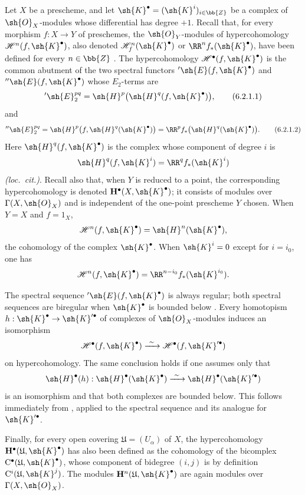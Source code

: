 \begin{env}[6.2.1]
\label{III.6.2.1}
Let $X$ be a prescheme, and let
$\sh{K}^\bullet=(\sh{K}^i)_{i\in\bb{Z}}$ be a complex of
$\sh{O}_X$-modules whose differential has degree $+1$.
Recall that, for every morphism $f:X\to Y$ of preschemes, the
$\sh{O}_Y$-modules of hypercohomology
$\mathcal{H}^n(f,\sh{K}^\bullet)$, also denoted
$\mathcal{H}_f^n(\sh{K}^\bullet)$ or
$\RR^n f_*(\sh{K}^\bullet)$, have been defined for every
$n\in\bb{Z}$ .  The hypercohomology
$\mathcal{H}^\bullet(f,\sh{K}^\bullet)$ is the common abutment of
the two spectral functors
$'\sh{E}(f,\sh{K}^\bullet)$ and
$''\sh{E}(f,\sh{K}^\bullet)$ whose $E_2$-terms are
\[
  '\sh{E}_2^{pq}
  =
  \sh{H}^p\bigl(\sh{H}^q(f,\sh{K}^\bullet)\bigr),
  \tag{6.2.1.1}\label{III.6.2.1.1}
\]
and
\[
  ''\sh{E}_2^{pq}
  =
  \sh{H}^p\bigl(f,\sh{H}^q(\sh{K}^\bullet)\bigr)
  =
  \RR^p f_*\bigl(\sh{H}^q(\sh{K}^\bullet)\bigr).
  \tag{6.2.1.2}\label{III.6.2.1.2}
\]
Here $\sh{H}^q(f,\sh{K}^\bullet)$ is the complex whose component
of degree $i$ is
\[
  \sh{H}^q(f,\sh{K}^i)=\RR^q f_*(\sh{K}^i)
\]
\emph{(loc.\ cit.)}.  Recall also that, when $Y$ is reduced to a
point, the corresponding hypercohomology is denoted
$\mathbf{H}^\bullet(X,\sh{K}^\bullet)$; it consists of modules
over $\Gamma(X,\sh{O}_X)$ and is independent of the one-point
prescheme $Y$ chosen.  When $Y=X$ and $f=1_X$,
\[
  \mathcal{H}^n(f,\sh{K}^\bullet)
  =
  \sh{H}^n(\sh{K}^\bullet),
\]
the cohomology of the complex $\sh{K}^\bullet$.  When
$\sh{K}^i=0$ except for $i=i_0$, one has
\[
  \mathcal{H}^n(f,\sh{K}^\bullet)
  =
  \RR^{n-i_0}f_*(\sh{K}^{i_0}).
\]

The spectral sequence $'\sh{E}(f,\sh{K}^\bullet)$ is always
regular; both spectral sequences are biregular when
$\sh{K}^\bullet$ is bounded below .
Every homotopism
$h:\sh{K}^\bullet\to\sh{K}'^\bullet$ of complexes of
$\sh{O}_X$-modules  induces an isomorphism
\[
  \mathcal{H}^\bullet(f,\sh{K}^\bullet)
  \xrightarrow{\ \sim\ }
  \mathcal{H}^\bullet(f,\sh{K}'^\bullet)
\]
on hypercohomology.  The same conclusion holds if one assumes only
that
\[
  \sh{H}^\bullet(h):
  \sh{H}^\bullet(\sh{K}^\bullet)
  \xrightarrow{\ \sim\ }
  \sh{H}^\bullet(\sh{K}'^\bullet)
\]
is an isomorphism and that both complexes are bounded below.  This
follows immediately from , applied to the
spectral sequence  and its analogue for
$\sh{K}'^\bullet$.

Finally, for every open covering
$\mathfrak{U}=(U_\alpha)$ of $X$, the hypercohomology
$\mathbf{H}^\bullet(\mathfrak{U},\sh{K}^\bullet)$ has also been
defined  as the cohomology of the bicomplex
$\mathrm{C}^\bullet(\mathfrak{U},\sh{K}^\bullet)$, whose component
of bidegree $(i,j)$ is by definition
$\mathrm{C}^i(\mathfrak{U},\sh{K}^j)$.  The modules
$\mathbf{H}^n(\mathfrak{U},\sh{K}^\bullet)$ are again modules over
$\Gamma(X,\sh{O}_X)$.
\end{env}

